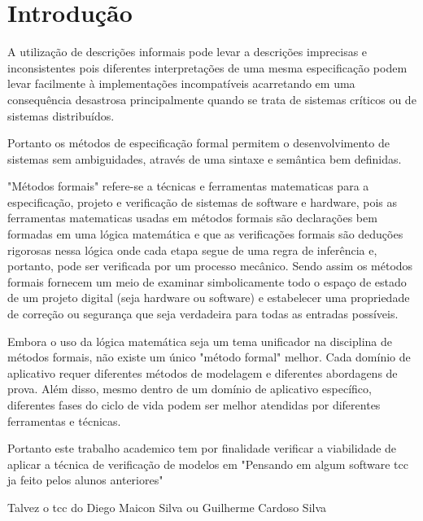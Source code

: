 \section{Introdução}

A utilização de descrições informais pode levar a descrições imprecisas e inconsistentes pois diferentes interpretações de uma mesma especificação podem levar facilmente à implementações incompatíveis acarretando em uma consequência desastrosa principalmente quando se trata de sistemas críticos ou de sistemas distribuídos. 
\cite{ufrgs}

Portanto os métodos de especificação formal permitem o desenvolvimento de sistemas sem ambiguidades, através de uma sintaxe e semântica bem definidas.  
\cite{intro}

"Métodos formais" refere-se a técnicas e ferramentas matematicas para a especificação, projeto e verificação de sistemas de software e hardware, pois as ferramentas matematicas usadas em métodos formais são declarações bem formadas em uma lógica matemática e que as verificações formais são deduções rigorosas nessa lógica onde cada etapa segue de uma regra de inferência e, portanto, pode ser verificada por um processo mecânico. Sendo assim os métodos formais fornecem um meio de examinar simbolicamente todo o espaço de estado de um projeto digital (seja hardware ou software) e estabelecer uma propriedade de correção ou segurança que seja verdadeira para todas as entradas possíveis.
\cite{nasa}

Embora o uso da lógica matemática seja um tema unificador na disciplina de métodos formais, não existe um único "método formal" melhor. Cada domínio de aplicativo requer diferentes métodos de modelagem e diferentes abordagens de prova. Além disso, mesmo dentro de um domínio de aplicativo específico, diferentes fases do ciclo de vida podem ser melhor atendidas por diferentes ferramentas e técnicas.
\cite{nasa}

Portanto este trabalho academico tem por finalidade verificar a viabilidade de aplicar a técnica de verificação de modelos em "Pensando em algum software tcc ja feito pelos alunos anteriores"

Talvez o tcc do Diego Maicon Silva ou Guilherme Cardoso Silva